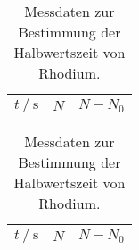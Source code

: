 \begin{table}
  \hspace*{\fill}
  \begin{subfigure}{0.40\textwidth}
  \centering
  \label{tab:2a}
  \begin{tabular}{c c c}
    \toprule
    {$t \:/\: \si{\second}$} & {$N$} & {$N-N_0$}\\
    \midrule
    
    \bottomrule
  \end{tabular}
\end{subfigure}
\hspace*{\fill}
\begin{subfigure}{0.40\textwidth}
  \centering
  \label{tab:2b}
  \begin{tabular}{c c c}
    \toprule
    {$t \:/\: \si{\second}$}		& {$N$}		&
  	{$N-N_0$}		\\
    \midrule
    
    \bottomrule
  \end{tabular}
\end{subfigure}
\\
\hspace*{\fill}
\hspace*{\fill}
\caption{Messdaten zur Bestimmung der Halbwertszeit von Rhodium.}
\label{tab:2}
\end{table}


